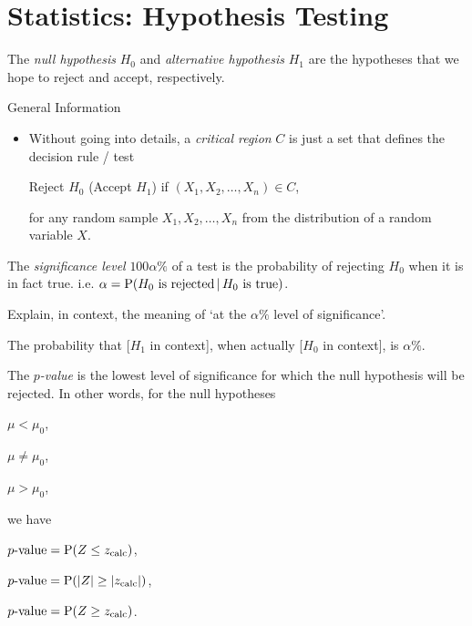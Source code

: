 \documentclass[../Notes.tex]{subfiles}
\begin{document}
\chapter{Statistics: Hypothesis Testing}
\begin{definition}{}{}
  The \emph{null hypothesis} \(H_0\) and \emph{alternative hypothesis} \(H_1\) are the hypotheses that we hope to reject and accept, respectively. 
\end{definition}
\begin{stbox}{General Information}
  \begin{itemize}
    \item Without going into details, a \emph{critical region} \(C\) is just a set that defines the decision rule / test 
    \begin{center}
      Reject \(H_0\) (Accept \(H_1\)) \quad if \((X_1,X_2,\dots,X_n)\in C\),
    \end{center}
    for any random sample \(X_1,X_2,\dots,X_n\) from the distribution of a random variable \(X\).
  \end{itemize}
\end{stbox}
\begin{definition}{}{}
  The \emph{significance level} \(100\alpha\%\) of a test is the probability of rejecting \(H_0\) when it is in fact true. i.e. \(\alpha=\operatorname{P}(H_0\text{ is rejected}\,\vert\,H_0\text{ is true})\).
\end{definition}
\begin{note}
  Explain, in context, the meaning of `at the \(\alpha\%\) level of significance'.
  \begin{center}
    \parbox{0.9\textwidth}{
      The probability that [\(H_1\) in context], when actually [\(H_0\) in context], is \(\alpha\%\).
    }
  \end{center}
\end{note}
\begin{definition}{}{}
  The \emph{\(p\)-value} is the lowest level of significance for which the null hypothesis will be rejected. In other words, for the null hypotheses
    \begin{center}
      \begin{enumerate*}[label=(\alph*),itemjoin={\quad}]
        \item \(\mu<\mu_0\),
        \item \(\mu \neq \mu_0\),
        \item \(\mu>\mu_0\),
      \end{enumerate*}
    \end{center}
    we have
    \begin{center}
      \begin{enumerate*}[label=(\alph*),itemjoin={\quad}]
        \item \(p\text{-value}=\operatorname{P}(Z\leq z_\text{calc})\),
        \item \(p\text{-value}=\operatorname{P}(\lvert Z \rvert\geq \lvert z_\text{calc} \rvert)\),
        \item \(p\text{-value}=\operatorname{P}(Z\geq z_\text{calc})\).
      \end{enumerate*}
    \end{center}
\end{definition}
\end{document}
